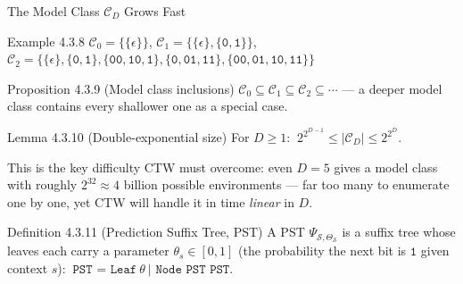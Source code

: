 \documentclass[aspectratio=169,10pt]{beamer}
\begin{document}
\begin{frame}{The Model Class $\mathcal{C}_D$ Grows Fast}
\begin{exampleblock}{Example 4.3.8}
$\mathcal C_0=\{\{\epsilon\}\}$, \quad
$\mathcal C_1 = \{\{\epsilon\},\{\mathtt0,\mathtt1\}\}$, \quad
$\mathcal C_2 = \{\{\epsilon\},\{\mathtt0,\mathtt1\},\{\mathtt{00},\mathtt{10},\mathtt1\},
\{\mathtt0,\mathtt{01},\mathtt{11}\},\{\mathtt{00},\mathtt{01},\mathtt{10},\mathtt{11}\}\}$
\end{exampleblock}

\begin{block}{Proposition 4.3.9 (Model class inclusions)}
$\mathcal C_0\subseteq \mathcal C_1\subseteq \mathcal C_2\subseteq \cdots$ — a deeper model
class contains every shallower one as a special case.
\end{block}

\begin{block}{Lemma 4.3.10 (Double-exponential size)}
For $D\ge1$: $\ 2^{2^{D-1}} \le |\mathcal C_D| \le 2^{2^D}$.
\end{block}
This is the key difficulty CTW must overcome: even $D=5$ gives a model class with roughly
$2^{32}\approx 4$ billion possible environments — far too many to enumerate one by one, yet
CTW will handle it in time \emph{linear} in $D$.

\begin{block}{Definition 4.3.11 (Prediction Suffix Tree, PST)}
A PST $\Psi_{\mathcal S,\Theta_{\mathcal S}}$ is a suffix tree whose leaves each carry a
parameter $\theta_s\in[0,1]$ (the probability the next bit is $\mathtt1$ given context $s$):
$\ \texttt{PST = Leaf}\ \theta\ \texttt{| Node PST PST}$.
\end{block}
\end{frame}
\end{document}
